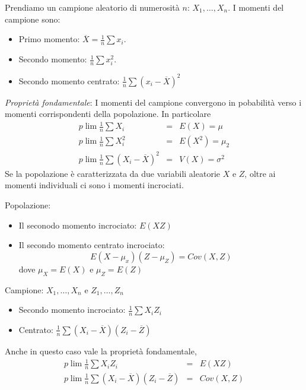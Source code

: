 \documentclass[a4paper]{report}
\theoremstyle{remark}
\begin{document}
\noindent Prendiamo un campione aleatorio di numerosit\`{a} $n$: $%
X_{1},\ldots ,X_{n}$. I momenti del campione sono:

\begin{itemize}
\item Primo momento: $\overline{X}=\frac{1}{n}\sum x_{i}$.

\item Secondo momento: $\frac{1}{n}\sum x_{i}^{2}$.

\item Secondo momento centrato: $\frac{1}{n}\sum (x_{i}-\overline{X})^{2}$
\end{itemize}

\noindent \emph{Propriet\`{a} fondamentale}: I momenti del campione
convergono in pobabilit\`{a} verso i momenti corrispondenti della
popolazione. In particolare%
\begin{eqnarray*}
p\lim \frac{1}{n}\sum X_{i} &=&E\left( X\right) =\mu \\
p\lim \frac{1}{n}\sum X_{i}^{2} &=&E\left( X^{2}\right) =\mu _{2} \\
p\lim \frac{1}{n}\sum \left( X_{i}-\overline{X}\right) ^{2} &=&V\left(
X\right) =\sigma ^{2}
\end{eqnarray*}%
Se la popolazione \`{e} caratterizzata da due variabili aleatorie $X$ e $Z$,
oltre ai momenti individuali ci sono i momenti incrociati.

\noindent Popolazione:

\begin{itemize}
\item Il seconodo momento incrociato: $E(XZ)$

\item Il secondo momento centrato incrociato: 
\begin{equation*}
E(X-\mu _{x})(Z-\mu _{Z})=Cov(X,Z)
\end{equation*}%
dove $\mu _{X}=E(X)$ e $\mu _{Z}=E(Z)$
\end{itemize}

\noindent Campione: $X_{1},\ldots ,X_{n}$ e $Z_{1},\ldots ,Z_{n}$

\begin{itemize}
\item Secondo momento incrociato: $\frac{1}{n}\sum X_{i}Z_{i}$

\item Centrato: $\frac{1}{n}\sum (X_{i}-\overline{X})(Z_{i}-\overline{Z})$
\end{itemize}

\noindent Anche in questo caso vale la propriet\`{a} fondamentale,%
\begin{eqnarray*}
p\lim \frac{1}{n}\sum X_{i}Z_{i} &=&E\left( XZ\right) \\
p\lim \frac{1}{n}\sum \left( X_{i}-\overline{X}\right) \left( Z_{i}-%
\overline{Z}\right) &=&Cov\left( X,Z\right)
\end{eqnarray*}
\end{document}
